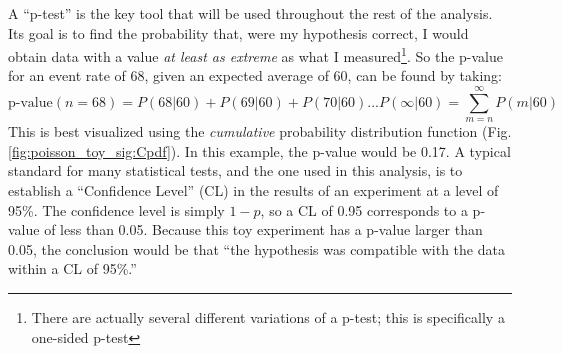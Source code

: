     \FloatBarrier
    A ``p-test'' is the key tool that will be used throughout the rest of the analysis.
    Its goal is to find the probability that, were my hypothesis correct,
        I would obtain data with a value \textit{at least as extreme} as what I measured\footnote{
            There are actually several different variations of a p-test;
            this is specifically a one-sided p-test}.
    So the p-value for an event rate of 68, given an expected average of 60, can be found by taking:
    \begin{equation}
        \textrm{p-value}(n=68) = P(68|60) + P(69|60) + P(70|60) ... P(\infty|60) = \sum\limits_{m=n}^\infty P(m|60)
    \end{equation}
    This is best visualized using the \textit{cumulative} probability distribution function (Fig. \ref{fig:poisson_toy_sig:Cpdf}).
    In this example, the p-value would be 0.17.
    A typical standard for many statistical tests, and the one used in this analysis,
        is to establish a ``Confidence Level'' (CL) in the results of an experiment at a level of 95\%. 
    The confidence level is simply $1-p$, so a CL of 0.95 corresponds to a p-value of less than 0.05.
    Because this toy experiment has a p-value larger than 0.05,
        the conclusion would be that ``the hypothesis was compatible with the data within a CL of 95\%.''


